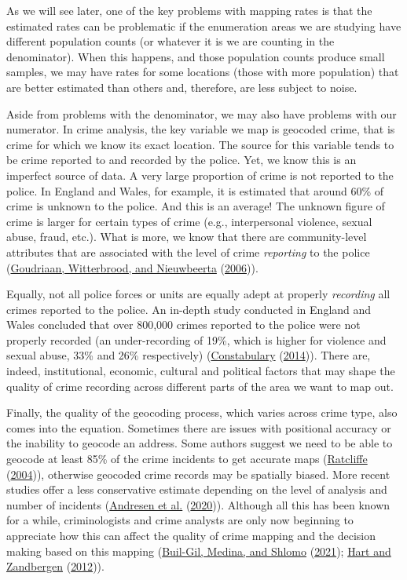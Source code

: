 \documentclass[
]{book}
\begin{document}
As we will see later, one of the key problems with mapping rates is that the estimated rates can be problematic if the enumeration areas we are studying have different population counts (or whatever it is we are counting in the denominator). When this happens, and those population counts produce small samples, we may have rates for some locations (those with more population) that are better estimated than others and, therefore, are less subject to noise.

Aside from problems with the denominator, we may also have problems with our numerator. In crime analysis, the key variable we map is geocoded crime, that is crime for which we know its exact location. The source for this variable tends to be crime reported to and recorded by the police. Yet, we know this is an imperfect source of data. A very large proportion of crime is not reported to the police. In England and Wales, for example, it is estimated that around 60\% of crime is unknown to the police. And this is an average! The unknown figure of crime is larger for certain types of crime (e.g., interpersonal violence, sexual abuse, fraud, etc.). What is more, we know that there are community-level attributes that are associated with the level of crime \emph{reporting} to the police (\protect\hyperlink{ref-Goudriaan_2006}{Goudriaan, Witterbrood, and Nieuwbeerta} (\protect\hyperlink{ref-Goudriaan_2006}{2006})).

Equally, not all police forces or units are equally adept at properly \emph{recording} all crimes reported to the police. An in-depth study conducted in England and Wales concluded that over 800,000 crimes reported to the police were not properly recorded (an under-recording of 19\%, which is higher for violence and sexual abuse, 33\% and 26\% respectively) (\protect\hyperlink{ref-HMIC_2014}{Constabulary} (\protect\hyperlink{ref-HMIC_2014}{2014})). There are, indeed, institutional, economic, cultural and political factors that may shape the quality of crime recording across different parts of the area we want to map out.

Finally, the quality of the geocoding process, which varies across crime type, also comes into the equation. Sometimes there are issues with positional accuracy or the inability to geocode an address. Some authors suggest we need to be able to geocode at least 85\% of the crime incidents to get accurate maps (\protect\hyperlink{ref-Ratcliffe_2004}{Ratcliffe} (\protect\hyperlink{ref-Ratcliffe_2004}{2004})), otherwise geocoded crime records may be spatially biased. More recent studies offer a less conservative estimate depending on the level of analysis and number of incidents (\protect\hyperlink{ref-Andresen_2020}{Andresen et al.} (\protect\hyperlink{ref-Andresen_2020}{2020})). Although all this has been known for a while, criminologists and crime analysts are only now beginning to appreciate how this can affect the quality of crime mapping and the decision making based on this mapping (\protect\hyperlink{ref-Buil-Gil_2021}{Buil-Gil, Medina, and Shlomo} (\protect\hyperlink{ref-Buil-Gil_2021}{2021}); \protect\hyperlink{ref-Hart_2012}{Hart and Zandbergen} (\protect\hyperlink{ref-Hart_2012}{2012})).
\end{document}
